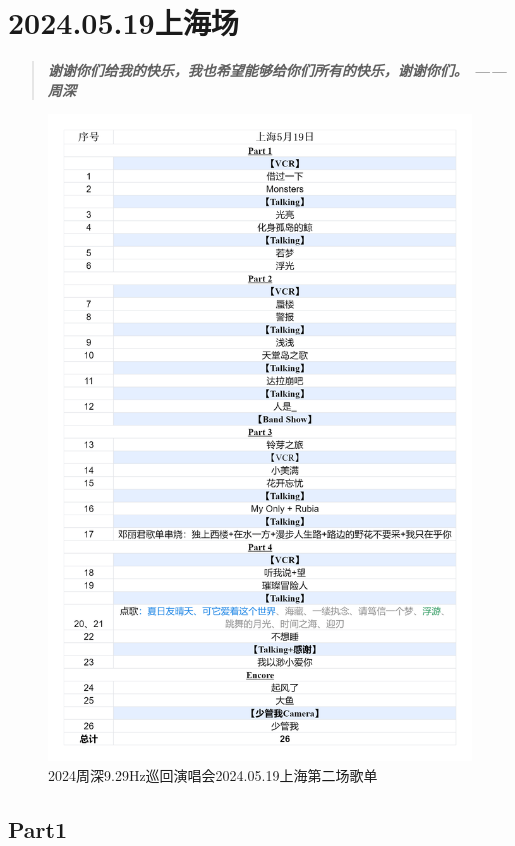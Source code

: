 \documentclass[]{ctexbook}
\begin{document}
\chapter{2024.05.19上海场}\label{shanghai-20240519}

\begin{quote}
\textbf{\emph{谢谢你们给我的快乐，我也希望能够给你们所有的快乐，谢谢你们。 ------ 周深}}
\end{quote}

\begin{figure}

{\centering \includegraphics[width=320pt]{img/playlists/playlists-shanghai-20240519} 

}

\caption{2024周深9.29Hz巡回演唱会2024.05.19上海第二场歌单}\label{fig:unnamed-chunk-38}
\end{figure}

\newpage

\section{Part1}\label{shanghai-20240519-part1}
\end{document}
